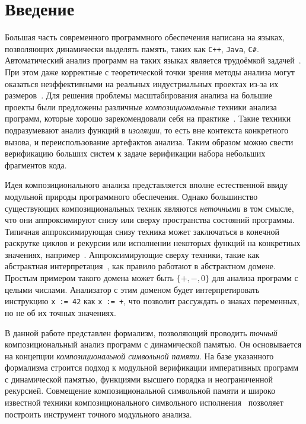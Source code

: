 \section*{Введение}

Большая часть современного программного обеспечения написана на языках, позволяющих  динамически выделять память, таких как \texttt{C++}, \texttt{Java}, \texttt{C\#}. Автоматический анализ программ на таких языках является трудоёмкой задачей~\cite{distefano2009attacking}. При этом даже корректные с теоретической точки зрения методы анализа могут оказаться неэффективными на реальных индустриальных проектах из-за их размеров~\cite{calcagno2011compositional}. Для решения проблемы масштабирования анализа на большие проекты были предложены различные \emph{композициональные} техники анализа программ, которые хорошо зарекомендовали себя на практике~\cite{gurfinkel2015seahorn,anand2008demand,distefano2008jstar,calcagno2011infer}. Такие техники подразумевают анализ функций в \emph{изоляции}, то есть вне контекста конкретного вызова, и переиспользование артефактов анализа. Таким образом можно свести верификацию больших систем к задаче верификации набора небольших фрагментов кода.

Идея композиционального анализа представляется вполне естественной ввиду модульной природы программного обеспечения. Однако большинство существующих композициональных техник являются \emph{неточными} в том смысле, что они аппроксимируют снизу или сверху пространства состояний программы. Типичная аппроксимирующая снизу техника может заключаться в конечной раскрутке циклов и рекурсии или исполнении некоторых функций на конкретных значениях, например~\cite{tillmann2008pex}. Аппроксимирующие сверху техники, такие как абстрактная интерпретация~\cite{cousot1977abstract}, как правило работают в абстрактном домене. Простым примером такого домена может быть $\{+, -, 0\}$ для анализа программ с целыми числами. Анализатор с этим доменом будет интерпретировать инструкцию \lstinline{x := 42} как \lstinline{x := +}, что позволит рассуждать о знаках переменных, но не об их точных значениях.

В данной работе представлен формализм, позволяющий проводить \emph{точный} композициональный анализ программ с динамической памятью. Он основывается на концепции \emph{композициональной символьной памяти}. На базе указанного формализма строится подход к модульной верификации императивных программ с динамической памятью, функциями высшего порядка и неограниченной рекурсией. Совмещение композициональной символьной памяти и широко известной техники композиционального символьного исполнения~\cite{godefroid2007compositional} позволяет построить инструмент точного модульного анализа.

